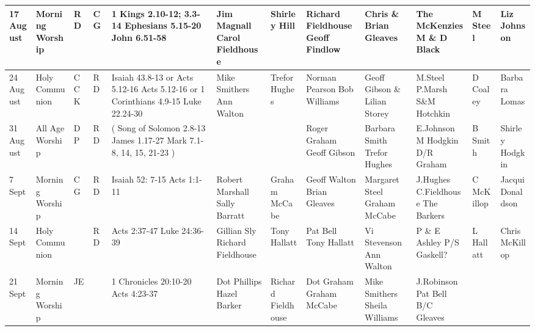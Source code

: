 \documentclass[10pt,a4paper]{article}
\begin{document}
\begin{center}
{\begin{tabular}{|p{1.6cm}|p{1.4cm}|p{0.6cm}|p{0.6cm}|p{3.2cm}|p{2cm}|p{1.5cm}|p{2.0cm}|p{2.0cm}|p{2.0cm}
|p{1.6cm}|p{1.4cm}|}
17 August   & Morning Worship   &  RD & CG  & 
1 Kings 2.10-12; 3.3-14 
Ephesians 5.15-20
John 6.51-58
& 
Jim Magnall Carol Fieldhouse  & Shirley Hill &
Richard Fieldhouse Geoff Findlow & Chris \& \linebreak Brian Gleaves   & 
The Mc\-Kenzies M \& D Black
 & M Steel   & Liz Johnson  \\ 
\hline
24 August  & Holy Communion & CCK  & RD &
Isaiah 43.8-13 or Acts 5.12-16
Acts 5.12-16 or 1 Corinthians 4.9-15
Luke 22.24-30
& Mike Smithers Ann Walton  &  Trefor Hughes & Norman Pearson \linebreak Bob Williams & 
Geoff  Gibson \& Lilian Storey &
M.Steel P.Marsh \linebreak S\&M Hotchkin
& D Coaley  &  Barbara Lomas \\
\hline %
31 August & All Age Worship
 & DP & RD & 
{\footnotesize (
Song of Solomon 2.8-13 
James 1.17-27 
Mark 7.1-8, 14, 15, 21-23
)}
&  
  & 
  & Roger Graham Geoff Gibson & 
Barbara Smith \linebreak Trefor Hughes &
E.Johnson   \linebreak M Hodgkin  \linebreak D/R Graham
 & B Smith & Shirley Hodgkin \\
\hline
7 Sept & Morning Worship &  CG & RD & %
Isaiah 52: 7-15
Acts 1:1-11
  &    Robert Marshall Sally Barratt & 
Graham McCabe & Geoff Walton  Brian Gleaves & 
Margaret Steel \linebreak Graham McCabe &
J.Hughes \linebreak C.Fieldhouse \linebreak The Barkers
& C McKillop  & Jacqui Donaldson \\
\hline
14 Sept & Holy Communion
&  & RD & 
Acts 2:37-47
Luke 24:36-39
& Gillian Sly  Richard Fieldhouse & 
Tony \linebreak Hallatt & Pat Bell \linebreak Tony Hallatt & 
Vi Stevenson Ann Walton &
P \& E Ashley P/S Gaskell?
& L Hallatt  & Chris McKillop \\
\hline
21 Sept & Morning Worship  
& JE  &  & 
1 Chronicles 20:10-20
Acts 4:23-37
    &  Dot Phillips Hazel Barker&
Richard Fieldhouse & Dot Graham \linebreak Graham McCabe  & 
Mike Smithers Sheila Williams &
J.Robinson \linebreak Pat Bell \linebreak  B/C Gleaves

\end{tabular}}
\end{center}
\end{document}

